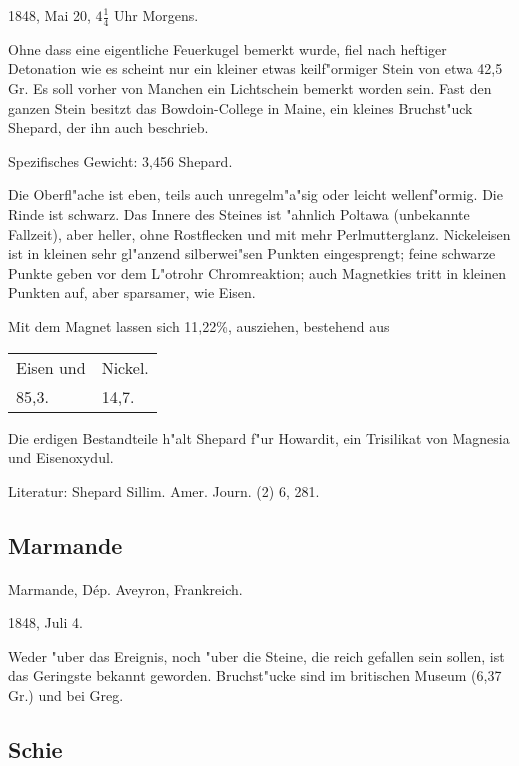 \documentclass[a4paper, 11pt, oneside]{article}
\begin{document}
1848, Mai 20, $4\frac{1}{4}$ Uhr Morgens.

Ohne dass eine eigentliche Feuerkugel bemerkt wurde, fiel nach heftiger Detonation wie es scheint nur ein kleiner etwas keilf"ormiger Stein von etwa 42,5 Gr. Es soll vorher von Manchen ein Lichtschein bemerkt worden sein. Fast den ganzen Stein besitzt das Bowdoin-College in Maine, ein kleines Bruchst"uck Shepard, der ihn auch beschrieb.

Spezifisches Gewicht: 3,456 Shepard.

Die Oberfl"ache ist eben, teils auch unregelm"a"sig oder leicht wellenf"ormig. Die Rinde ist schwarz. Das Innere des Steines ist "ahnlich Poltawa (unbekannte Fallzeit), aber heller, ohne Rostflecken und mit mehr Perlmutterglanz. Nickeleisen ist in kleinen sehr gl"anzend silberwei"sen Punkten eingesprengt; feine schwarze Punkte geben vor dem L"otrohr Chromreaktion; auch Magnetkies tritt in kleinen Punkten auf, aber sparsamer, wie Eisen.

Mit dem Magnet lassen sich 11,22\%, ausziehen, bestehend aus
\begin{table}[H]
    \centering
    \begin{tabular}{l l}
        Eisen und & Nickel. \\
        85,3. & 14,7. \\
    \end{tabular}
\end{table}

Die erdigen Bestandteile h"alt Shepard f"ur Howardit, ein Trisilikat von Magnesia und Eisenoxydul.

\footnotesize
Literatur: Shepard Sillim. Amer. Journ. (2) 6, 281.

\subsection{Marmande}
\normalsize
\paragraph{}
Marmande, Dép. Aveyron, Frankreich.

1848, Juli 4.

Weder "uber das Ereignis, noch "uber die Steine, die reich gefallen sein sollen, ist das Geringste bekannt geworden. Bruchst"ucke sind im britischen Museum (6,37 Gr.) und bei Greg.

\subsection{Schie}
\normalsize
\end{document}
